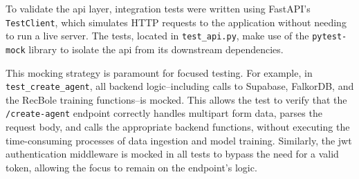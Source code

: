To validate the \acs{api} layer, integration tests were written using FastAPI's \texttt{TestClient}, which simulates HTTP requests to the application without needing to run a live server. The tests, located in \texttt{test\_api.py}, make use of the \texttt{pytest-mock} library to isolate the \acs{api} from its downstream dependencies.

This mocking strategy is paramount for focused testing. For example, in \texttt{test\_create\_agent}, all backend logic--including calls to Supabase, FalkorDB, and the RecBole training functions--is mocked. This allows the test to verify that the \texttt{/create-agent} endpoint correctly handles multipart form data, parses the request body, and calls the appropriate backend functions, without executing the time-consuming processes of data ingestion and model training. Similarly, the \acs{jwt} authentication middleware is mocked in all tests to bypass the need for a valid token, allowing the focus to remain on the endpoint's logic.